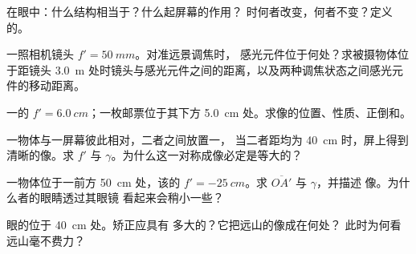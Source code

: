 \begin{exercise}[$\star$]\label{exo:g11:lenses-and-eye:5}
在眼中：什么结构相当于？什么起屏幕的作用？
时何者改变，何者不变？定义
的。
\end{exercise}

\begin{exercise}[$\star\star$]\label{exo:g11:lenses-and-eye:6}
一照相机镜头 $f' = \qty{50}{mm}$。对准远景调焦时，
感光元件位于何处？求被摄物体位于距镜头
\qty{3.0}{m} 处时镜头与感光元件之间的距离，以及两种调焦状态之间感光元件的移动距离。
\end{exercise}

\begin{exercise}[$\star\star$]\label{exo:g11:lenses-and-eye:7}
一的 $f' = \qty{6.0}{cm}$；一枚邮票位于其下方
\qty{5.0}{cm} 处。求像的位置、性质、正倒和。
\end{exercise}

\begin{exercise}[$\star\star$]\label{exo:g11:lenses-and-eye:8}
一物体与一屏幕彼此相对，二者之间放置一，
当二者距均为 \qty{40}{cm} 时，屏上得到清晰的像。求
$f'$ 与 $\gamma$。为什么这一对称成像必定是等大的？
\end{exercise}

\begin{exercise}[$\star\star$]\label{exo:g11:lenses-and-eye:9}
一物体位于一前方 \qty{50}{cm} 处，该的
$f' = \qty{-25}{cm}$。求 $\overline{OA'}$ 与 $\gamma$，并描述
像。为什么者的眼睛透过其眼镜
看起来会稍小一些？
\end{exercise}

\begin{exercise}[$\star\star$]\label{exo:g11:lenses-and-eye:10}
眼的位于 \qty{40}{cm} 处。矫正应具有
多大的？它把远山的像成在何处？
此时为何看远山毫不费力？
\end{exercise}

